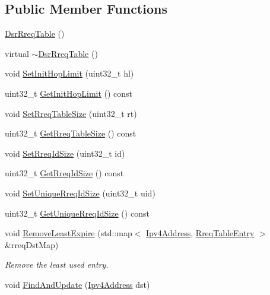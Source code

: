 \subsection*{Public Member Functions}
\begin{DoxyCompactItemize}
\item 
\hyperlink{classns3_1_1dsr_1_1DsrRreqTable_a2d8dd021c1a6c2bb8d366de34491f22e}{Dsr\+Rreq\+Table} ()
\item 
virtual \hyperlink{classns3_1_1dsr_1_1DsrRreqTable_a17577163bf9a7570e69c808aa01f92d1}{$\sim$\+Dsr\+Rreq\+Table} ()
\item 
void \hyperlink{classns3_1_1dsr_1_1DsrRreqTable_a58eb1b0397efd92ed6bbaa40a5190da7}{Set\+Init\+Hop\+Limit} (uint32\+\_\+t hl)
\item 
uint32\+\_\+t \hyperlink{classns3_1_1dsr_1_1DsrRreqTable_aa1db6788b3df7470d395f435886b5bcb}{Get\+Init\+Hop\+Limit} () const 
\item 
void \hyperlink{classns3_1_1dsr_1_1DsrRreqTable_aaf96bd60ea3d3f137af5753b939e721e}{Set\+Rreq\+Table\+Size} (uint32\+\_\+t rt)
\item 
uint32\+\_\+t \hyperlink{classns3_1_1dsr_1_1DsrRreqTable_a48056cb795dd5a3ae3cc28d5358a195e}{Get\+Rreq\+Table\+Size} () const 
\item 
void \hyperlink{classns3_1_1dsr_1_1DsrRreqTable_aedad1b5a741d7a10daf05de8e5071d2e}{Set\+Rreq\+Id\+Size} (uint32\+\_\+t id)
\item 
uint32\+\_\+t \hyperlink{classns3_1_1dsr_1_1DsrRreqTable_a3575b0f16ab6c58e73b5f435f6e89aa1}{Get\+Rreq\+Id\+Size} () const 
\item 
void \hyperlink{classns3_1_1dsr_1_1DsrRreqTable_a37081d3a9979d666bbccb6432772c7e9}{Set\+Unique\+Rreq\+Id\+Size} (uint32\+\_\+t uid)
\item 
uint32\+\_\+t \hyperlink{classns3_1_1dsr_1_1DsrRreqTable_ae3894084f7aeaab53a8382f2f32b10f1}{Get\+Unique\+Rreq\+Id\+Size} () const 
\item 
void \hyperlink{classns3_1_1dsr_1_1DsrRreqTable_aff44d7a02a9b024e5a77d035e6453a9e}{Remove\+Least\+Expire} (std\+::map$<$ \hyperlink{classns3_1_1Ipv4Address}{Ipv4\+Address}, \hyperlink{structns3_1_1dsr_1_1RreqTableEntry}{Rreq\+Table\+Entry} $>$ \&rreq\+Dst\+Map)
\begin{DoxyCompactList}\small\item\em Remove the least used entry. \end{DoxyCompactList}\item 
void \hyperlink{classns3_1_1dsr_1_1DsrRreqTable_a1ad376426517477ac20982d0114b25d0}{Find\+And\+Update} (\hyperlink{classns3_1_1Ipv4Address}{Ipv4\+Address} dst)

\end{DoxyCompactItemize}
